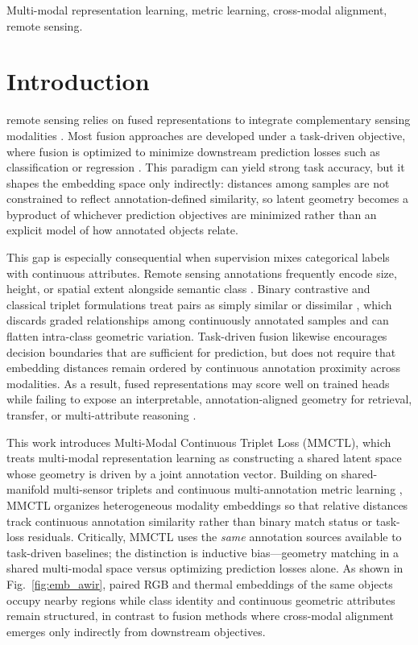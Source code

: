 \documentclass[lettersize,journal]{IEEEtran}
\begin{document}
\begin{IEEEkeywords}
Multi-modal representation learning, metric learning, cross-modal alignment, remote sensing.
\end{IEEEkeywords}

\section{Introduction}
 remote sensing relies on fused representations to integrate complementary sensing modalities \cite{chen2024novel}. Most fusion approaches are developed under a task-driven objective, where fusion is optimized to minimize downstream prediction losses such as classification or regression \cite{bai2025task}. This paradigm can yield strong task accuracy, but it shapes the embedding space only indirectly: distances among samples are not constrained to reflect annotation-defined similarity, so latent geometry becomes a byproduct of whichever prediction objectives are minimized rather than an explicit model of how annotated objects relate.

This gap is especially consequential when supervision mixes categorical labels with continuous attributes. Remote sensing annotations frequently encode size, height, or spatial extent alongside semantic class \cite{sun2023single}. Binary contrastive and classical triplet formulations treat pairs as simply similar or dissimilar \cite{khosla2020supervised}, which discards graded relationships among continuously annotated samples and can flatten intra-class geometric variation. Task-driven fusion likewise encourages decision boundaries that are sufficient for prediction, but does not require that embedding distances remain ordered by continuous annotation proximity across modalities. As a result, fused representations may score well on trained heads while failing to expose an interpretable, annotation-aligned geometry for retrieval, transfer, or multi-attribute reasoning \cite{saidi2024deep}.

This work introduces Multi-Modal Continuous Triplet Loss (MMCTL), which treats multi-modal representation learning as constructing a shared latent space whose geometry is driven by a joint annotation vector. Building on shared-manifold multi-sensor triplets \cite{dutt2022shared} and continuous multi-annotation metric learning \cite{zhou2025multi,kim2019deep}, MMCTL organizes heterogeneous modality embeddings so that relative distances track continuous annotation similarity rather than binary match status or task-loss residuals. Critically, MMCTL uses the \emph{same} annotation sources available to task-driven baselines; the distinction is inductive bias---geometry matching in a shared multi-modal space versus optimizing prediction losses alone. As shown in Fig.~\ref{fig:emb_awir}, paired RGB and thermal embeddings of the same objects occupy nearby regions while class identity and continuous geometric attributes remain structured, in contrast to fusion methods where cross-modal alignment emerges only indirectly from downstream objectives.
\end{document}
